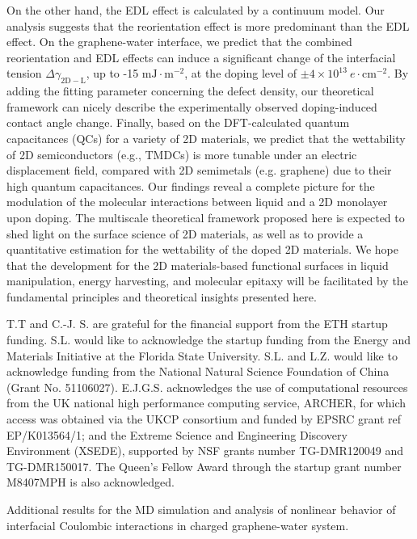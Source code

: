 \documentclass[journal=langd5,manuscript=article,email=true,hyperref=true,keywords=true]{achemso}
\begin{document}
On the other hand, the EDL effect is calculated by a continuum model. Our
analysis suggests that the reorientation effect is more predominant
than the EDL effect. On the graphene-water interface, we predict that
the combined reorientation and EDL effects can induce a significant
change of the interfacial tension \(\Delta
\gamma_{\mathrm{2D-L}}\), up to -15 \(\mathrm{mJ}\cdot
\mathrm{m}^{-2}\), at the doping level of \(\pm 4 \times 10^{13}\ e\cdot
\mathrm{cm}^{-2}\). By adding the fitting parameter concerning the
defect density, our theoretical framework can nicely describe the
experimentally observed doping-induced contact angle change. Finally,
based on the DFT-calculated quantum capacitances (QCs) for a variety
of 2D materials, we predict that the wettability of 2D semiconductors
(e.g., TMDCs) is more tunable under an electric displacement field,
compared with 2D semimetals (e.g. graphene) due to their high quantum
capacitances. Our findings reveal a complete picture for the
modulation of the molecular interactions between liquid and a 2D monolayer upon
doping. The multiscale theoretical
framework proposed here is expected to shed
light on the surface science of 2D materials, 
as well as to provide a quantitative estimation for the wettability
of the doped 2D materials. We hope that the development for the 2D
materials-based functional surfaces in liquid manipulation, energy
harvesting, and molecular epitaxy will be facilitated by the
fundamental principles and theoretical insights presented here.

\begin{acknowledgement}
  T.T and C.-J. S. are grateful for the financial support from the ETH
  startup funding.  S.L. would like to acknowledge the startup funding
  from the Energy and Materials Initiative at the Florida State
  University. S.L. and L.Z. would like to acknowledge funding from the
  National Natural Science Foundation of China (Grant
  No. 51106027). E.J.G.S. acknowledges the use of computational
  resources from the UK national high performance computing service,
  ARCHER, for which access was obtained via the UKCP consortium and
  funded by EPSRC grant ref EP/K013564/1; and the Extreme Science and
  Engineering Discovery Environment (XSEDE), supported by NSF grants
  number TG-DMR120049 and TG-DMR150017. The Queen’s Fellow Award
  through the startup grant number M8407MPH is also acknowledged.
\end{acknowledgement}

\begin{suppinfo}
Additional results for the MD simulation and analysis of nonlinear
behavior of interfacial Coulombic interactions in charged
graphene-water system.
\end{suppinfo}





\end{document}
